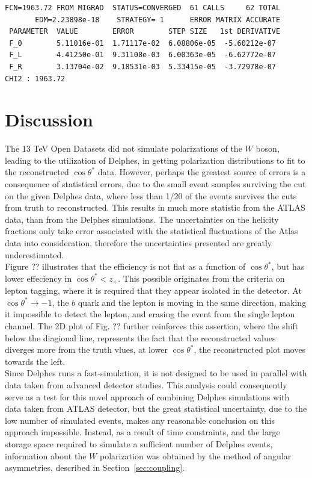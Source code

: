 \documentclass[12pt,a4paper]{article}
\numberwithin{equation}{section}
\begin{document}
\begin{verbatim}
FCN=1963.72 FROM MIGRAD  STATUS=CONVERGED  61 CALLS     62 TOTAL
       EDM=2.23898e-18    STRATEGY= 1      ERROR MATRIX ACCURATE
 PARAMETER  VALUE        ERROR        STEP SIZE   1st DERIVATIVE
 F_0        5.11016e-01  1.71117e-02  6.08806e-05  -5.60212e-07
 F_L        4.41250e-01  9.31108e-03  6.00363e-05  -6.62772e-07
 F_R        3.13704e-02  9.18531e-03  5.33415e-05  -3.72978e-07
CHI2 : 1963.72
\end{verbatim}


\section{Discussion}
The 13 TeV Open Datasets did not simulate polarizations of the $W$ boson,
leading to the utilization of Delphes, in getting polarization distributions to
fit to the reconstructed $\cos \theta^{*}$ data. However, perhaps the greatest source
of errors is a consequence of statistical errors, due to the small event samples
surviving the cut on the given Delphes data, where less than 1/20 of the events
survives the cuts from truth to reconstructed. This results in much more
statistic from the ATLAS data, than from the Delphes simulations. The
uncertainties on the helicity fractions only take error associated with the
statistical fluctuations of the Atlas data into consideration, therefore the
uncertainties presented are greatly underestimated.\\ %

Figure ?? illustrates that the efficiency is not flat as a function of
$\cos \theta^{*}$, but has lower effeciency in $\cos \theta^{*} < z_+$. This possible
originates from the criteria on lepton tagging, where it is required that they
appear isolated in the detector. At $\cos \theta^{*} \rightarrow -1$, the $b$ quark and the
lepton is moving in the same direction, making it impossible to detect the
lepton, and erasing the event from the single lepton channel. The 2D plot of
Fig. ?? further reinforces this assertion, where the shift below the diagional
line, represents the fact that the reconstructed values diverges more from
the truth vlues, at lower $\cos \theta^{*}$, the reconstructed plot moves towards the
left.\\

Since Delphes runs a fast-simulation, it is not designed to be used in parallel
with data taken from advanced detector studies. This analysis could consequently
serve as a test for this novel approach of combining Delphes simulations with
data taken from ATLAS detector, but the great statistical uncertainty, due to
the low number of simulated events, makes any reasonable conclusion on this
approach impossible. Instead, as a result of time constraints, and the large
storage space required to simulate a sufficient number of Delphes events,
information about the $W$ polarization was obtained by the method of angular
asymmetries, described in Section~\ref{sec:coupling}.\\
\end{document}
